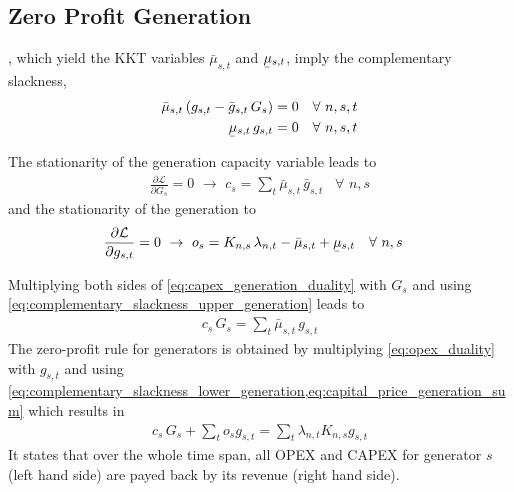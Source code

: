 \documentclass[11pt,twocolumn]{article}
\newcommand{\ubar}[1]{\underaccent{\bar}{#1}}
\newcommand{\Forall}[1]{\hspace{10pt} \forall \,\, #1 }
\newcommand{\pdv}[2]{\frac{\partial #1}{\partial #2}}
\newcommand{\generation}{g_{s,t}}
\newcommand{\generationpotential}{\bar{g}_{s,t}}
\newcommand{\capacitygeneration}{G_{s}}
\newcommand{\operationalpricegeneration}{o_{s}}
\newcommand{\capitalpricegeneration}{c_{s}}
\newcommand{\mulowergeneration}{\ubar{\mu}_{s,t}}
\newcommand{\muuppergeneration}{\bar{\mu}_{s,t}}
\newcommand{\lagrangian}{\mathcal{L}}
\newcommand{\lmp}[1][n]{\lambda_{#1,t}}
\newcommand{\incidencegenerator}[1][n]{K_{#1,s}}
\begin{document}
\subsection{Zero Profit Generation}
\label{sec:zero_profit_generation}
, which yield the KKT variables $\muuppergeneration$ and $\mulowergeneration$, imply the complementary slackness,
\begin{align}
\muuppergeneration \left( \generation - \generationpotential \, \capacitygeneration \right)  &= 0  \Forall{n,s,t} 
\label{eq:complementary_slackness_upper_generation} \\
\mulowergeneration  \, \generation &= 0 \Forall{n,s,t}
\label{eq:complementary_slackness_lower_generation} 
\end{align}


The stationarity of the generation capacity variable leads to 
\begin{align}
\pdv{\lagrangian}{\capacitygeneration}  = 0 \,\, \rightarrow \,\, 
\capitalpricegeneration =  \sum_t \muuppergeneration \, \generationpotential  \Forall{n,s}
\label{eq:capex_generation_duality}
\end{align}
and the stationarity of the generation to 
\begin{align}
\pdv{\lagrangian}{\generation} &= 0 \,\, \rightarrow \,\,  
\operationalpricegeneration =  \incidencegenerator \, \lmp - \muuppergeneration + \mulowergeneration \Forall{n,s} \label{eq:opex_duality}
\end{align}


Multiplying both sides of \cref{eq:capex_generation_duality} with $\capacitygeneration$ and using \cref{eq:complementary_slackness_upper_generation} leads to 
\begin{align}
 \capitalpricegeneration \, \capacitygeneration  = \sum_t \muuppergeneration \, \generation 
 \label{eq:capital_price_generation_sum}
\end{align}
The zero-profit rule for generators is obtained by multiplying \cref{eq:opex_duality} with $\generation$ and using \cref{eq:complementary_slackness_lower_generation,eq:capital_price_generation_sum} which results in 
\begin{align}
  \capitalpricegeneration \, \capacitygeneration + \sum_t \operationalpricegeneration \generation = \sum_t \lmp \incidencegenerator \generation
\end{align}
It states that over the whole time span, all OPEX and CAPEX for generator $s$ (left hand side) are payed back by its revenue (right hand side).
\end{document}
